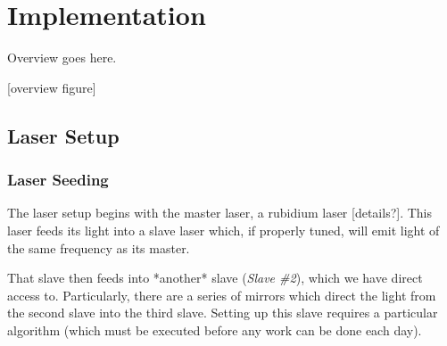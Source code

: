 \newpage
\section{Implementation}

Overview goes here.

[overview figure]

\subsection{Laser Setup}
    \subsubsection{Laser Seeding}
    
The laser setup begins with the master laser, a rubidium laser [details?].  This laser feeds its light into a slave laser which, if properly tuned, will emit light of the same frequency as its master.

That slave then feeds into *another* slave (\emph{Slave \#2}), which we have direct access to.  Particularly, there are a series of mirrors which direct the light from the second slave into the third slave.  Setting up this slave requires a particular algorithm (which must be executed before any work can be done each day).

